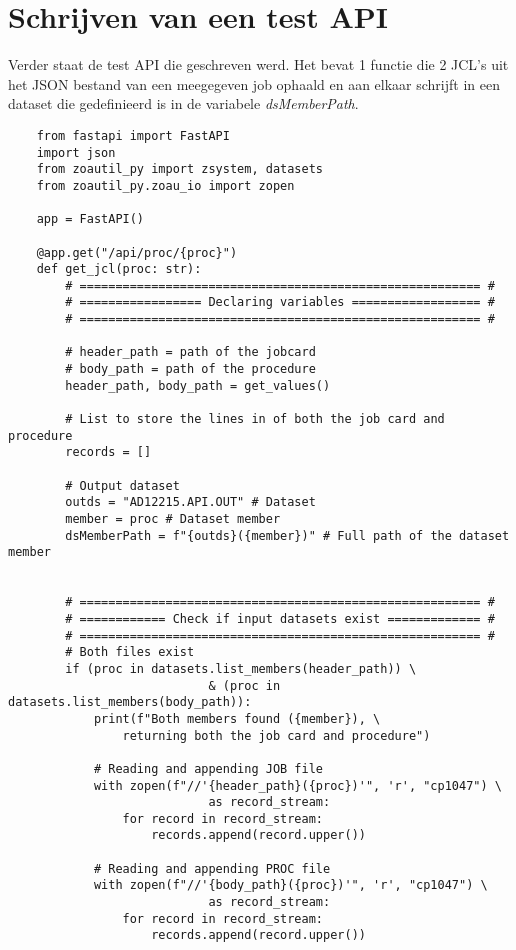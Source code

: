 \section{Schrijven van een test API}
Verder staat de test API die geschreven werd. Het bevat 1 functie die 2 JCL's uit het JSON bestand van een meegegeven job ophaald en aan elkaar schrijft in een dataset die gedefinieerd is in de variabele \textit{dsMemberPath}. 
\begin{lstlisting}
    from fastapi import FastAPI
    import json
    from zoautil_py import zsystem, datasets
    from zoautil_py.zoau_io import zopen
    
    app = FastAPI()
    
    @app.get("/api/proc/{proc}")
    def get_jcl(proc: str):
        # ======================================================== #
        # ================= Declaring variables ================== #
        # ======================================================== #
        
        # header_path = path of the jobcard
        # body_path = path of the procedure
        header_path, body_path = get_values()
        
        # List to store the lines in of both the job card and procedure
        records = []
        
        # Output dataset
        outds = "AD12215.API.OUT" # Dataset
        member = proc # Dataset member
        dsMemberPath = f"{outds}({member})" # Full path of the dataset member
        
        
        # ======================================================== #
        # ============ Check if input datasets exist ============= #
        # ======================================================== #
        # Both files exist
        if (proc in datasets.list_members(header_path)) \
                            & (proc in datasets.list_members(body_path)):
            print(f"Both members found ({member}), \
                returning both the job card and procedure")
        
            # Reading and appending JOB file
            with zopen(f"//'{header_path}({proc})'", 'r', "cp1047") \
                            as record_stream:
                for record in record_stream:
                    records.append(record.upper())
        
            # Reading and appending PROC file
            with zopen(f"//'{body_path}({proc})'", 'r', "cp1047") \
                            as record_stream:
                for record in record_stream:
                    records.append(record.upper())
        

\end{lstlisting}
